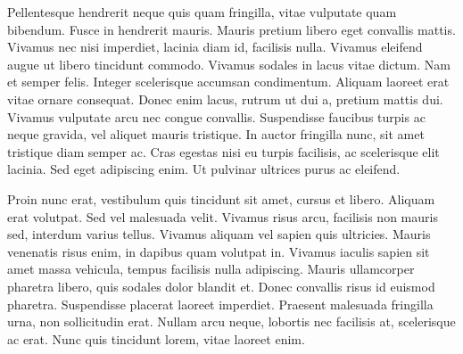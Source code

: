 \documentclass[titlepage,a4paper,12pt,thmsb]{report}
\begin{document}
Pellentesque hendrerit neque quis quam fringilla, vitae vulputate quam bibendum. Fusce in hendrerit mauris. Mauris pretium libero eget convallis mattis. Vivamus nec nisi imperdiet, lacinia diam id, facilisis nulla. Vivamus eleifend augue ut libero tincidunt commodo. Vivamus sodales in lacus vitae dictum. Nam et semper felis. Integer scelerisque accumsan condimentum. Aliquam laoreet erat vitae ornare consequat. Donec enim lacus, rutrum ut dui a, pretium mattis dui. Vivamus vulputate arcu nec congue convallis. Suspendisse faucibus turpis ac neque gravida, vel aliquet mauris tristique. In auctor fringilla nunc, sit amet tristique diam semper ac. Cras egestas nisi eu turpis facilisis, ac scelerisque elit lacinia. Sed eget adipiscing enim. Ut pulvinar ultrices purus ac eleifend.

Proin nunc erat, vestibulum quis tincidunt sit amet, cursus et libero. Aliquam erat volutpat. Sed vel malesuada velit. Vivamus risus arcu, facilisis non mauris sed, interdum varius tellus. Vivamus aliquam vel sapien quis ultricies. Mauris venenatis risus enim, in dapibus quam volutpat in. Vivamus iaculis sapien sit amet massa vehicula, tempus facilisis nulla adipiscing. Mauris ullamcorper pharetra libero, quis sodales dolor blandit et. Donec convallis risus id euismod pharetra. Suspendisse placerat laoreet imperdiet. Praesent malesuada fringilla urna, non sollicitudin erat. Nullam arcu neque, lobortis nec facilisis at, scelerisque ac erat. Nunc quis tincidunt lorem, vitae laoreet enim.
\end{document}
